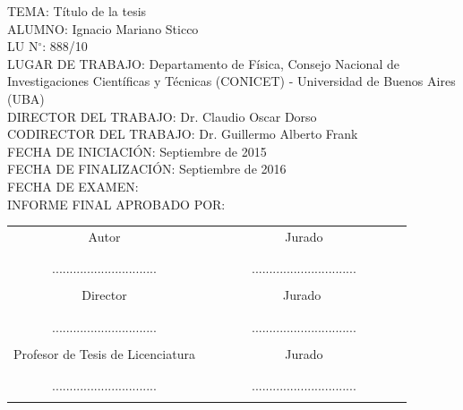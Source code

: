 \begin{flushleft}
TEMA: Título de la tesis\\

ALUMNO: Ignacio Mariano Sticco\\

LU N$^{\circ}$: 888/10 \\

LUGAR DE TRABAJO: Departamento de Física, Consejo Nacional de Investigaciones Cient\'ificas y T\'ecnicas (CONICET) - Universidad de Buenos Aires (UBA)\\

DIRECTOR DEL TRABAJO: Dr. Claudio Oscar Dorso \\

CODIRECTOR DEL TRABAJO: Dr. Guillermo Alberto Frank\\

FECHA DE INICIACI\'ON: Septiembre de 2015 \\

FECHA DE FINALIZACI\'ON: Septiembre de 2016\\

FECHA DE EXAMEN:  \\

INFORME FINAL APROBADO POR:
\end{flushleft}                                                              %
\vspace{2cm}

\begin{center}
\begin{tabular}{|c|c|}
\hline
Autor &  \,\,\,\,\, \,\,\,\,\,\,\,\,\, \,\,\,\,\,\,\,\,\,\,\,\,\,\,\,\,\,\,Jurado \,\,\,\,\,\,\,\,\,\,\,\,\,\,\,\,\,\,\,\, \,\,\,\,\,\,\,\,\,\,\,\, \\
&            \\
       &            \\
  ..............................            &     ..............................          \\
       &            \\

\hline
Director &      \,\,\,\,\, \,\,\,\,\,\,\,\,\, \,\,\,\,\,\,\,\,\,\,\,\,\,\,\,\,\,\,Jurado \,\,\,\,\, \,\,\,\,\,\,\,\,\,\,\,\,\,\,\,\,\,\,\,\, \,\,\,\,\,\,\,\\
&            \\
       &            \\
  ..............................            &       ..............................        \\
         &            \\
 \hline
Profesor de Tesis de Licenciatura &  \,\,\,\,\,\,\, \,\,\,\,\, \,\,\,\,\,\,\,\,\,\,\,\,\,\,\,\,\,\,\,\,Jurado \,\,\,\,\,\,\,\,\,\,\,\,\,\,\,\,\,\,\,\,\,\,\,\,\,\,\, \,\,\,\,\,\\
&            \\
       &            \\
  ..............................            &      ..............................         \\
         &            \\
\hline
\end{tabular}
\end{center}
